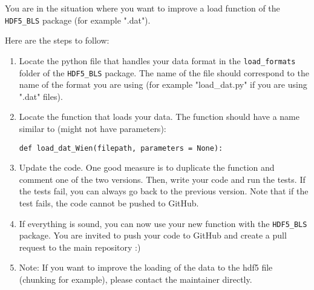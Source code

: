 \begin{tcolorbox}
    You are in the situation where you want to improve a load function of the \texttt{HDF5\_BLS} package (for example ".dat").
\end{tcolorbox}

Here are the steps to follow:
\begin{enumerate}
    \item Locate the python file that handles your data format in the \texttt{load\_formats} folder of the \texttt{HDF5\_BLS} package. The name of the file should correspond to the name of the format you are using (for example "load\_dat.py" if you are using ".dat" files).
    \item Locate the function that loads your data. The function should have a name similar to (might not have parameters):
\begin{lstlisting}
def load_dat_Wien(filepath, parameters = None):
\end{lstlisting}
    \item Update the code. One good measure is to duplicate the function and comment one of the two versions. Then, write your code and run the tests. If the tests fail, you can always go back to the previous version. Note that if the test fails, the code cannot be pushed to GitHub.
    \item If everything is sound, you can now use your new function with the \texttt{HDF5\_BLS} package. You are invited to push your code to GitHub and create a pull request to the main repository :)
    \item Note: If you want to improve the loading of the data to the hdf5 file (chunking for example), please contact the maintainer directly.
\end{enumerate}